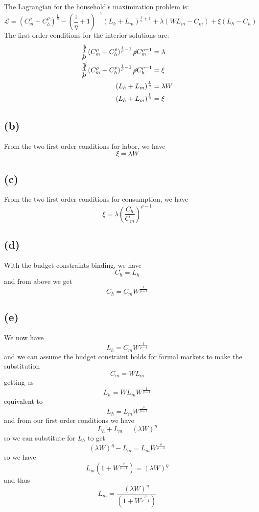 \documentclass[11pt]{amsart}
\begin{document}
 The Lagrangian for the household's maximization problem is:
\[
	\mathcal{L} = \left( C_m^\rho + C_h^\rho \right)^{\frac{1}{\rho}} - \left( \frac{1}{\eta} + 1 \right)^{-1} \left(  L_h + L_m \right)^{\frac{1}{\eta} + 1} + \lambda \left( W L_m - C_m \right) + \xi \left(L_h - C_h \right)
\]
	The first order conditions for the interior solutions are:
	\begin{align*}
	\cancel{\frac{1}{\rho}}\left( C_m^\rho + C_h^\rho \right)^{\frac{1}{\rho} -1} \cancel{\rho}  C_m^{\rho-1} &= \lambda \\
	\cancel{\frac{1}{\rho}} \left( C_m^\rho + C_h^\rho \right)^{\frac{1}{\rho} -1} \cancel{\rho} C_h^{\rho-1} & = \xi \\
	\left(  L_h + L_m \right)^{\frac{1}{\eta} }  &=\lambda W \\
	\left(  L_h + L_m \right)^{\frac{1}{\eta} }  &= \xi 	 
	\end{align*}

\subsection*{(b)}

From the two first order conditions for labor, we have 
\[
\xi = \lambda W
\]

\subsection*{(c)}

From the two first order conditions for consumption, we have
\[
\xi = \lambda \left( \frac{C_h}{C_m} \right)^{\rho-1}
\]

\subsection*{(d)}

With the budget constraints binding, we have
\[
C_h = L_h
\]
and from above we get
\[
C_h = C_m W^{\frac{1}{\rho-1}}
\]

\subsection*{(e)}

We now have
\[
L_h = C_m W^{\frac{1}{\rho-1}}
\]
and we can assume the budget constraint holds for formal markets to make the substitution
\[
C_m = WL_m
\]
getting us
\[
L_h = WL_m W^{\frac{1}{\rho-1}}
\]
equivalent to
\[
L_h = L_m W^{\frac{\rho}{\rho-1}}
\]
and from our first order conditions we have
\[
L_h + L_m = (\lambda W)^{\eta}
\]
so we can substitute for $L_h$ to get
\[
(\lambda W)^{\eta} - L_m = L_m W^{\frac{\rho}{\rho-1}}
\]
so we have
\[
L_m (1 + W^{\frac{\rho}{\rho-1}}) = (\lambda W)^{\eta}
\]
and thus
\[
L_m = \frac{(\lambda W)^{\eta}}{(1 + W^{\frac{\rho}{\rho-1}})}
\]
\end{document}

